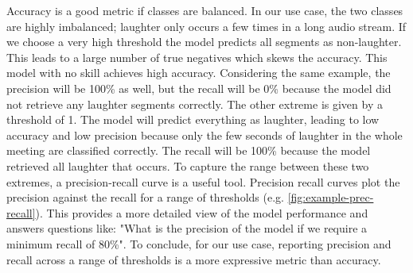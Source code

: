 \documentclass[bsc,frontabs,parskip,deptreport]{infthesis}
\begin{document}
Accuracy is a good metric if classes are balanced. In our use case, the two classes are highly imbalanced; laughter only occurs a few times in a long audio stream. If we choose a very high threshold the model predicts all segments as non-laughter. This leads to a large number of true negatives which skews the accuracy. This model with no skill achieves high accuracy.
Considering the same example, the precision will be 100\% as well, but the recall will be 0\% because the model did not retrieve any laughter segments correctly. 
The other extreme is given by a threshold of 1. The model will predict everything as laughter, leading to low accuracy and low precision because only the few seconds of laughter in the whole meeting are classified correctly. The recall will be 100\% because the model retrieved all laughter that occurs. 
To capture the range between these two extremes, a precision-recall curve is a useful tool. Precision recall curves plot the precision against the recall for a range of thresholds (e.g. \autoref{fig:example-prec-recall}). This provides a more detailed view of the model performance and answers questions like: "What is the precision of the model if we require a minimum recall of 80\%".
To conclude, for our use case, reporting precision and recall across a range of thresholds is a more expressive metric than accuracy.
\end{document}
